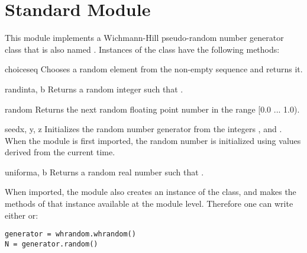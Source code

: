 \section{Standard Module }



This module implements a Wichmann-Hill pseudo-random number generator
class that is also named .  Instances of the
 class have the following methods:

\begin{funcdesc}{choice}{seq}
Chooses a random element from the non-empty sequence  and returns it.
\end{funcdesc}

\begin{funcdesc}{randint}{a, b}
Returns a random integer  such that .
\end{funcdesc}

\begin{funcdesc}{random}{}
Returns the next random floating point number in the range [0.0 ... 1.0).
\end{funcdesc}

\begin{funcdesc}{seed}{x, y, z}
Initializes the random number generator from the integers
,
and
.
When the module is first imported, the random number is initialized
using values derived from the current time.
\end{funcdesc}

\begin{funcdesc}{uniform}{a, b}
Returns a random real number  such that .
\end{funcdesc}

When imported, the  module also creates an instance of
the  class, and makes the methods of that instance
available at the module level.  Therefore one can write either 
 or:
\begin{verbatim}
generator = whrandom.whrandom()
N = generator.random()
\end{verbatim}
%
\begin{seealso}
\end{seealso}
